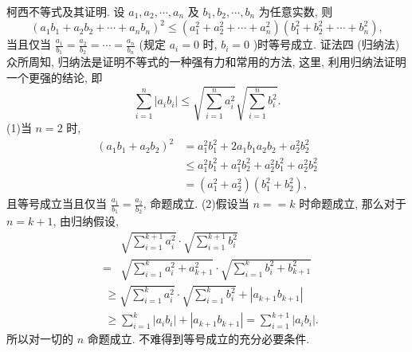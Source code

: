 柯西不等式及其证明.
设 $a_1, a_2, \cdots, a_n$ 及 $b_1, b_2, \cdots, b_n$ 为任意实数, 则
$$
\left(a_1 b_1+a_2 b_2+\cdots+a_n b_n\right)^2 \leqslant\left(a_1^2+a_2^2+\cdots+a_n^2\right)\left(b_1^2+b_2^2+\cdots+b_n^2\right),
$$
当且仅当 $\frac{a_1}{b_1}=\frac{a_2}{b_2}=\cdots=\frac{a_n}{b_n}$ (规定 $a_i=0$ 时, $b_i=0$ )时等号成立.
证法四 (归纳法)
众所周知, 归纳法是证明不等式的一种强有力和常用的方法, 这里, 利用归纳法证明一个更强的结论, 即
$$
\sum_{i=1}^n\left|a_i b_i\right| \leqslant \sqrt{\sum_{i=1}^n a_i^2} \sqrt{\sum_{i=1}^n b_i^2} .
$$
(1)当 $n=2$ 时,
$$
\begin{aligned}
\left(a_1 b_1+a_2 b_2\right)^2 & =a_1^2 b_1^2+2 a_1 b_1 a_2 b_2+a_2^2 b_2^2 \\
& \leqslant a_1^2 b_1^2+a_1^2 b_2^2+a_2^2 b_1^2+a_2^2 b_2^2 \\
& =\left(a_1^2+a_2^2\right)\left(b_1^2+b_2^2\right),
\end{aligned}
$$
且等号成立当且仅当 $\frac{a_1}{b_1}=\frac{a_2}{b_2}$, 命题成立.
(2)假设当 $n==k$ 时命题成立, 那么对于 $n=k+1$, 由归纳假设,
$$
\begin{aligned}
& \sqrt{\sum_{i=1}^{k+1} a_i^2} \cdot \sqrt{\sum_{i=1}^{k+1} b_i^2} \\
= & \sqrt{\sum_{i=1}^k a_i^2+a_{k+1}^2} \cdot \sqrt{\sum_{i=1}^k b_i^2+b_{k+1}^2}
\end{aligned}
$$
$$
\begin{aligned}
& \geqslant \sqrt{\sum_{i=1}^k a_i^2} \cdot \sqrt{\sum_{i=1}^k b_i^2}+\left|a_{k+1} b_{k+1}\right| \\
& \geqslant \sum_{i=1}^k\left|a_i b_i\right|+\left|a_{k+1} b_{k+1}\right|=\sum_{i=1}^{k+1}\left|a_i b_i\right| .
\end{aligned}
$$
所以对一切的 $n$ 命题成立.
不难得到等号成立的充分必要条件.



